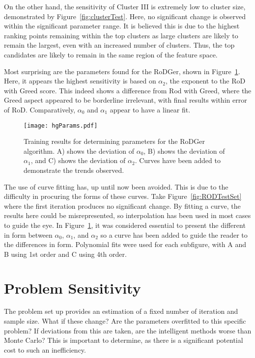 On the other hand, the sensitivity of Cluster III is extremely low to cluster size, demonstrated by Figure~\ref{fig:clusterTest}. Here, no significant change is observed within the significant parameter range. It is believed this is due to the highest ranking points remaining within the top clusters as large clusters are likely to remain the largest, even with an increased number of clusters. Thus, the top candidates are likely to remain in the same region of the feature space.

Most surprising are the parameters found for the RoDGer, shown in Figure~\ref{fig:paramHg}. Here, it appears the highest sensitivity is based on $\alpha_2$, the exponent to the RoD with Greed score. This indeed shows a difference from Rod with Greed, where the Greed aspect appeared to be borderline irrelevant, with final results within error of RoD. Comparatively, $\alpha_0$ and $\alpha_1$ appear to have a linear fit.

\begin{figure}[H]
    \begin{center}
        \texttt{[image: hgParams.pdf]}
        \caption[Non-parametric comparison]{Training results for determining parameters for the RoDGer algorithm. A) shows the deviation of $\alpha_0$, B) shows the deviation of $\alpha_1$, and C) shows the deviation of $\alpha_2$. Curves have been added to demonstrate the trends observed.}
        \label{fig:paramHg}
    \end{center}
\end{figure}

The use of curve fitting has, up until now been avoided. This is due to the difficulty in procuring the forms of these curves. Take Figure~\ref{fig:RODTestSet} where the first iteration produces no significant change. By fitting a curve, the results here could be misrepresented, so interpolation has been used in most cases to guide the eye. In Figure~\ref{fig:paramHg}, it was considered essential to present the different in form between ${\alpha_0}$, ${\alpha_1}$, and ${\alpha_2}$ so a curve has been added to guide the reader to the differences in form. Polynomial fits were used for each subfigure, with A and B using 1st order and C using 4th order.

\section{Problem Sensitivity}
The problem set up provides an estimation of a fixed number of iteration and sample size. What if these change? Are the parameters overfitted to this specific problem? If deviations from this are taken, are the intelligent methods worse than Monte Carlo? This is important to determine, as there is a significant potential cost to such an inefficiency.

